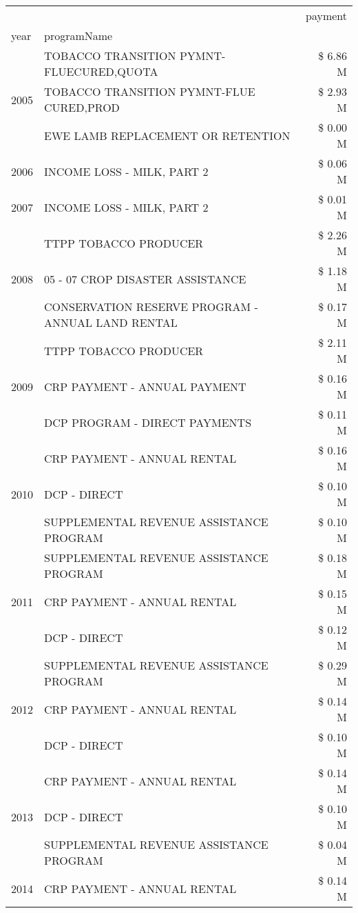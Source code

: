 \begin{tabular}{llr}
\toprule
 &  & payment \\
year & programName &  \\
\midrule
\multirow[t]{3}{*}{2005} & TOBACCO TRANSITION PYMNT-FLUECURED,QUOTA & \$ 6.86 M \\
 & TOBACCO TRANSITION PYMNT-FLUE CURED,PROD & \$ 2.93 M \\
 & EWE LAMB REPLACEMENT OR RETENTION & \$ 0.00 M \\
\cline{1-3}
2006 & INCOME LOSS - MILK, PART 2 & \$ 0.06 M \\
\cline{1-3}
2007 & INCOME LOSS - MILK, PART 2 & \$ 0.01 M \\
\cline{1-3}
\multirow[t]{3}{*}{2008} & TTPP TOBACCO PRODUCER & \$ 2.26 M \\
 & 05 - 07 CROP DISASTER ASSISTANCE & \$ 1.18 M \\
 & CONSERVATION RESERVE PROGRAM - ANNUAL LAND RENTAL & \$ 0.17 M \\
\cline{1-3}
\multirow[t]{3}{*}{2009} & TTPP TOBACCO PRODUCER & \$ 2.11 M \\
 & CRP PAYMENT - ANNUAL PAYMENT & \$ 0.16 M \\
 & DCP PROGRAM - DIRECT PAYMENTS & \$ 0.11 M \\
\cline{1-3}
\multirow[t]{3}{*}{2010} & CRP PAYMENT - ANNUAL RENTAL & \$ 0.16 M \\
 & DCP - DIRECT & \$ 0.10 M \\
 & SUPPLEMENTAL REVENUE ASSISTANCE PROGRAM & \$ 0.10 M \\
\cline{1-3}
\multirow[t]{3}{*}{2011} & SUPPLEMENTAL REVENUE ASSISTANCE PROGRAM & \$ 0.18 M \\
 & CRP PAYMENT - ANNUAL RENTAL & \$ 0.15 M \\
 & DCP - DIRECT & \$ 0.12 M \\
\cline{1-3}
\multirow[t]{3}{*}{2012} & SUPPLEMENTAL REVENUE ASSISTANCE PROGRAM & \$ 0.29 M \\
 & CRP PAYMENT - ANNUAL RENTAL & \$ 0.14 M \\
 & DCP - DIRECT & \$ 0.10 M \\
\cline{1-3}
\multirow[t]{3}{*}{2013} & CRP PAYMENT - ANNUAL RENTAL & \$ 0.14 M \\
 & DCP - DIRECT & \$ 0.10 M \\
 & SUPPLEMENTAL REVENUE ASSISTANCE PROGRAM & \$ 0.04 M \\
\cline{1-3}
\multirow[t]{3}{*}{2014} & CRP PAYMENT - ANNUAL RENTAL & \$ 0.14 M \\

\end{tabular}
